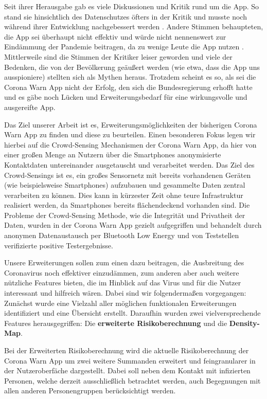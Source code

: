 \documentclass[conference,compsoc]{IEEEtran}
\begin{document}
Seit ihrer Herausgabe gab es viele Diskussionen und Kritik rund um die App. So stand sie hinsichtlich des Datenschutzes öfters in der Kritik und musste noch während ihrer Entwicklung nachgebessert werden \cite{CWAKritik}. 
Andere Stimmen behaupteten, die App sei überhaupt nicht effektiv und würde nicht nennenswert zur Eindämmung der Pandemie beitragen, da zu wenige Leute die App nutzen \cite{CWAKritik2}.
Mittlerweile sind die Stimmen der Kritiker leiser geworden und viele der Bedenken, die von der Bevölkerung geäußert werden (wie etwa, dass die App uns ausspioniere) stellten sich als Mythen heraus. 
Trotzdem scheint es so, als sei die Corona Warn App nicht der Erfolg, den sich die Bundesregierung erhofft hatte und es gäbe noch Lücken und Erweiterungsbedarf für eine wirkungsvolle und ausgereifte App.

Das Ziel unserer Arbeit ist es, Erweiterungsmöglichkeiten der bisherigen Corona Warn App zu finden und diese zu beurteilen. 
Einen besonderen Fokus legen wir hierbei auf die Crowd-Sensing Mechanismen der Corona Warn App, da hier von einer großen Menge an Nutzern über die Smartphones anonymisierte Kontaktdaten untereinander ausgetauscht und verarbeitet werden.
Das Ziel des Crowd-Sensings ist es, ein großes Sensornetz mit bereits vorhandenen Geräten (wie beispielsweise Smartphones) aufzubauen und gesammelte Daten zentral verarbeiten zu können. 
Dies kann in kürzester Zeit ohne teure Infrastruktur realisiert werden, da Smartphones bereits flächendeckend vorhanden sind.
Die Probleme der Crowd-Sensing Methode, wie die Integrität und Privatheit der Daten, wurden in der Corona Warn App gezielt aufgegriffen und behandelt durch anonymen Datenaustausch per Bluetooth Low Energy und von Teststellen verifizierte positive Testergebnisse.

Unsere Erweiterungen sollen zum einen dazu beitragen, die Ausbreitung des Coronavirus noch effektiver einzudämmen, zum anderen aber auch weitere nützliche Features bieten, die im Hinblick auf das Virus und für die Nutzer interessant und hilfreich wären.
Dabei sind wir folgendermaßen vorgegangen: Zunächst wurde eine Vielzahl aller möglichen funktionalen Erweiterungen identifiziert und eine Übersicht erstellt. 
Daraufhin wurden zwei vielversprechende Features herausgegriffen: Die \textbf{erweiterte Risikoberechnung} und die \textbf{Density-Map}.

Bei der Erweiterten Risikoberechnung wird die aktuelle Risikoberechnung der Corona Warn App um zwei weitere Summanden erweitert und feingranularer in der Nutzeroberfäche dargestellt. 
Dabei soll neben dem Kontakt mit infizierten Personen, welche derzeit ausschließlich betrachtet werden, auch Begegnungen mit allen anderen Personengruppen berücksichtigt werden.
\end{document}
